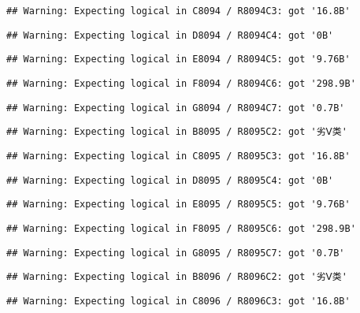 \documentclass[
]{article}
\begin{document}
\begin{verbatim}
## Warning: Expecting logical in C8094 / R8094C3: got '16.8B'
\end{verbatim}

\begin{verbatim}
## Warning: Expecting logical in D8094 / R8094C4: got '0B'
\end{verbatim}

\begin{verbatim}
## Warning: Expecting logical in E8094 / R8094C5: got '9.76B'
\end{verbatim}

\begin{verbatim}
## Warning: Expecting logical in F8094 / R8094C6: got '298.9B'
\end{verbatim}

\begin{verbatim}
## Warning: Expecting logical in G8094 / R8094C7: got '0.7B'
\end{verbatim}

\begin{verbatim}
## Warning: Expecting logical in B8095 / R8095C2: got '劣Ⅴ类'
\end{verbatim}

\begin{verbatim}
## Warning: Expecting logical in C8095 / R8095C3: got '16.8B'
\end{verbatim}

\begin{verbatim}
## Warning: Expecting logical in D8095 / R8095C4: got '0B'
\end{verbatim}

\begin{verbatim}
## Warning: Expecting logical in E8095 / R8095C5: got '9.76B'
\end{verbatim}

\begin{verbatim}
## Warning: Expecting logical in F8095 / R8095C6: got '298.9B'
\end{verbatim}

\begin{verbatim}
## Warning: Expecting logical in G8095 / R8095C7: got '0.7B'
\end{verbatim}

\begin{verbatim}
## Warning: Expecting logical in B8096 / R8096C2: got '劣Ⅴ类'
\end{verbatim}

\begin{verbatim}
## Warning: Expecting logical in C8096 / R8096C3: got '16.8B'
\end{verbatim}
\end{document}
